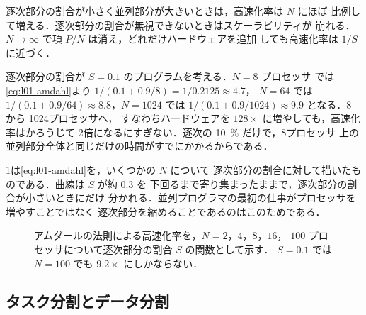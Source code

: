 \documentclass[../main.tex]{subfiles}
\begin{document}
逐次部分の割合が小さく並列部分が大きいときは，高速化率は $N$ にほぼ
比例して増える．逐次部分の割合が無視できないときはスケーラビリティが
崩れる．$N \to \infty$ で項 $P/N$ は消え，どれだけハードウェアを追加
しても高速化率は $1/S$ に近づく．

\begin{example}
  \label{ex:l01-amdahl}
  逐次部分の割合が $S = 0.1$ のプログラムを考える．$N = 8$ プロセッサ
  では\cref{eq:l01-amdahl}より $1/(0.1 + 0.9/8) = 1/0.2125 \approx 4.7$，
  $N = 64$ では $1/(0.1 + 0.9/64) \approx 8.8$，$N = 1024$ では
  $1/(0.1 + 0.9/1024) \approx 9.9$ となる．8 から 1024プロセッサへ，
  すなわちハードウェアを $128\times$ に増やしても，高速化率はかろうじて
  2倍になるにすぎない．逐次の \SI{10}{\percent} だけで，8プロセッサ
  上の並列部分全体と同じだけの時間がすでにかかるからである．
\end{example}

\cref{fig:l01-amdahl}は\cref{eq:l01-amdahl}を，いくつかの $N$ について
逐次部分の割合に対して描いたものである．曲線は $S$ が約 $0.3$ を
下回るまで寄り集まったままで，逐次部分の割合が小さいときにだけ
分かれる．並列プログラマの最初の仕事がプロセッサを増やすことではなく
逐次部分を縮めることであるのはこのためである．

\begin{figure}[tb]  %
  \centering
  
  \caption{アムダールの法則による高速化率を，$N = 2$，$4$，$8$，$16$，
    $100$ プロセッサについて逐次部分の割合 $S$ の関数として示す．
    $S = 0.1$ では $N = 100$ でも $9.2\times$ にしかならない．}
  \label{fig:l01-amdahl}
\end{figure}

\subsection{タスク分割とデータ分割}
\end{document}
